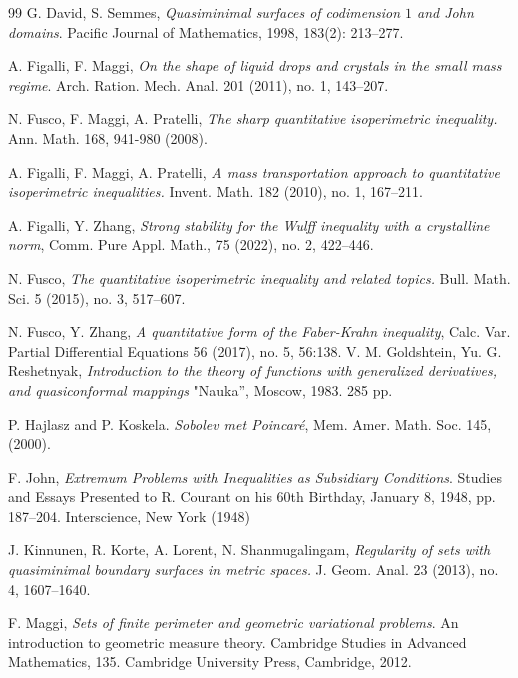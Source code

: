 \documentclass[reqno,11pt]{amsart}
\numberwithin{equation}{section}
\theoremstyle{remark}
\begin{document}
\begin{thebibliography}{99}
G. David, S. Semmes,  \emph{Quasiminimal surfaces of codimension $1$ and John domains}. Pacific Journal of Mathematics, 1998, 183(2): 213--277.

%

A. Figalli, F. Maggi, \emph{On the shape of liquid drops and crystals in the small mass regime}. Arch. Ration. Mech. Anal. 201 (2011), no. 1, 143--207.

N. Fusco, F. Maggi, A.  Pratelli, 
 \emph{The sharp quantitative isoperimetric inequality.} Ann. Math. 168, 941-980 (2008).

A. Figalli, F. Maggi, A.  Pratelli, 
 \emph{A mass transportation approach to quantitative isoperimetric inequalities.}
Invent. Math. 182 (2010), no. 1, 167--211.

A. Figalli, Y. Zhang, \emph{Strong stability for the Wulff inequality with a crystalline norm}, Comm. Pure Appl. Math., 75 (2022), no. 2, 422--446.

N. Fusco, \emph{The quantitative isoperimetric inequality and related topics.}
Bull. Math. Sci. 5 (2015), no. 3, 517--607.

N. Fusco, Y. Zhang, \emph{A quantitative form of the Faber-Krahn inequality}, Calc. Var. Partial Differential Equations 56 (2017), no. 5, 56:138.
%
V. M. Goldshtein, Yu. G. Reshetnyak, 
\emph{Introduction to the theory of functions with generalized derivatives, and quasiconformal mappings} "Nauka'', Moscow, 1983. 285 pp.
 
P. Hajlasz and P. Koskela. \emph{Sobolev met Poincar\'e}, Mem. Amer. Math. Soc.
145, (2000).

%
F. John, \emph{Extremum Problems with Inequalities as Subsidiary Conditions}. Studies and Essays
Presented to R. Courant on his 60th Birthday, January 8, 1948, pp. 187--204. Interscience, New York (1948)

J. Kinnunen, R. Korte, A. Lorent, N. Shanmugalingam, \emph{Regularity of sets with quasiminimal boundary surfaces in metric spaces.} 
J. Geom. Anal. 23 (2013), no. 4, 1607--1640.

F. Maggi, \emph{Sets of finite perimeter and geometric variational problems}. An introduction to geometric measure theory. Cambridge Studies in Advanced Mathematics, 135. Cambridge University Press, Cambridge, 2012.


\end{thebibliography}
\end{document}
